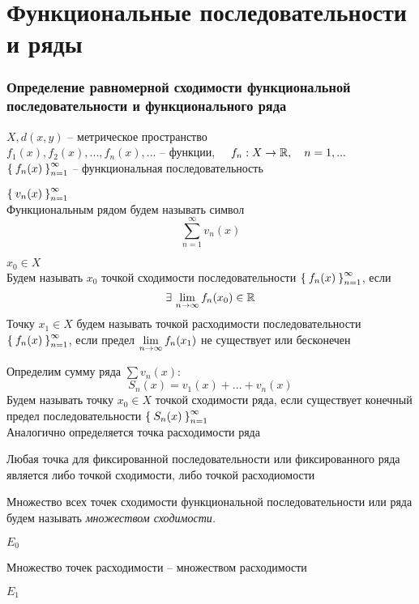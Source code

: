 \part{Функциональные последовательности и ряды}

\section{Определение равномерной сходимости функциональной последовательности и функционального ряда}

\begin{definition}
	$ X, d(x, y) $ -- метрическое пространство \\
	$ f_1(x), f_2(x), ..., f_n(x), ... $ -- функции, $ \quad f_n : X \to \mathbb{R}, \quad n = 1, ... $ \\
	$ \Set{f_n(x)}_{n=1}^{\infty} $ -- функциональная последовательность
\end{definition}

\begin{definition}
	$ \Set{v_n(x)}_{n=1}^{\infty} $ \\
	Функциональным рядом будем называть символ
	$$ \sum_{n = 1}^\infty v_n(x) $$
\end{definition}

\begin{definition}
	$ x_0 \in X $ \\
	Будем называть $ x_0 $ точкой сходимости последовательности $ \Set{f_n(x)}_{n=1}^{\infty} $, если
	$$ \exists\, \lim\limits_{n \to \infty}f_n(x_0) \in \mathbb{R} $$
	Точку $ x_1 \in X $ будем называть точкой расходимости последовательности $ \Set{f_n(x)}_{n=1}^{\infty} $, если предел $ \lim\limits_{n\to\infty} f_n(x_1) $ не существует или бесконечен
\end{definition}

\begin{definition}
	Определим сумму ряда $ \sum v_n(x) $:
	$$ S_n(x) = v_1(x) + ... + v_n(x) $$
	Будем называть точку $ x_0 \in X $ точкой сходимости ряда, если существует конечный предел последовательности $ \Set{S_n(x)}_{n=1}^{\infty} $ \\
	Аналогично определяется точка расходимости ряда
\end{definition}

\begin{remark}
	Любая точка для фиксированной последовательности или фиксированного ряда является либо точкой сходимости, либо точкой расходиомости
\end{remark}

\begin{definition}
	Множество всех точек сходимости функциональной последовательности или ряда будем называть \it{множеством сходимости}.
	\begin{notation}
		$ E_0 $
	\end{notation}
	Множество точек расходимости -- множеством расходимости
	\begin{notation}
		$ E_1 $
	\end{notation}
\end{definition}

